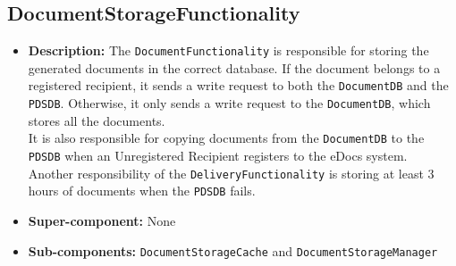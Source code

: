 \documentclass[a4paper,10pt]{article}
\begin{document}
\subsection{DocumentStorageFunctionality}
\begin{itemize}
    \item \textbf{Description:} The \texttt{DocumentFunctionality} is responsible for storing the generated documents in the correct database. If the document belongs to a registered recipient, it sends a write request to both the \texttt{DocumentDB} and the \texttt{PDSDB}. Otherwise, it only sends a write request to the \texttt{DocumentDB}, which stores all the documents.\\
    It is also responsible for copying documents from the \texttt{DocumentDB} to the \texttt{PDSDB} when an Unregistered Recipient registers to the eDocs system.\\ Another responsibility of the \texttt{DeliveryFunctionality} is storing at least 3 hours of documents when the \texttt{PDSDB} fails.
    \item \textbf{Super-component:} None
    \item \textbf{Sub-components:} \texttt{DocumentStorageCache} and \texttt{DocumentStorageManager}
\end{itemize}
\end{document}
